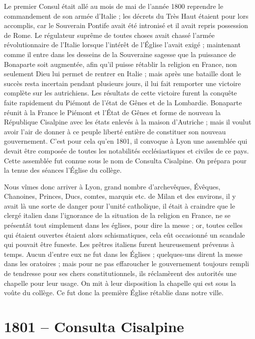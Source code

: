 \documentclass[11pt,a4paper]{report}
\begin{document}
Le premier Consul était allé au mois de mai de l'année 1800 reprendre le commandement de son armée d'Italie ; les décrets du Très Haut étaient pour lors accomplis, car le Souverain Pontife avait été intronisé et il avait repris possession de Rome. Le régulateur suprême de toutes choses avait chassé l'armée révolutionnaire de l'Italie lorsque l'intérêt de l'Église l'avait exigé ; maintenant comme il entre dans les desseins de la Souveraine sagesse que la puissance de Bonaparte soit augmentée, afin qu'il puisse rétablir la religion en France, non seulement Dieu lui permet de rentrer en Italie ; mais après une bataille dont le succès resta incertain pendant plusieurs jours, il lui fait remporter une victoire complète sur les autrichiens. Les résultats de cette victoire furent la conquête faite rapidement du Piémont de l'état de Gênes et de la Lombardie. Bonaparte réunit à la France le Piémont et l'État de Gênes et forme de nouveau la République Cisalpine avec les états enlevés à la maison d'Autriche ; mais il voulut avoir l'air de donner à ce peuple liberté entière de constituer son nouveau gouvernement. C'est pour cela qu'en 1801, il convoque à Lyon une assemblée qui devait être composée de toutes les notabilités ecclésiastiques et civiles de ce pays. Cette assemblée fut connue sous le nom de Consulta Cisalpine. On prépara pour la tenue des séances l'Église du collège.

Nous vîmes donc arriver à Lyon, grand nombre d'archevêques, Évêques, Chanoines, Princes, Ducs, comtes, marquis etc. de Milan et des environs, il y avait là une sorte de danger pour l'unité catholique, il était à craindre que le clergé italien dans l'ignorance de la situation de la religion en France, ne se présentât tout simplement dans les églises, pour dire la messe ; or, toutes celles qui étaient ouvertes étaient alors schismatiques, cela eût occasionné un scandale qui pouvait être funeste. Les prêtres italiens furent heureusement prévenus à temps. Aucun d'entre eux ne fut dans les Églises ; quelques-uns dirent la messe dans les oratoires ; mais pour ne pas effaroucher le gouvernement toujours rempli de tendresse pour ses chers constitutionnels, ils réclamèrent des autorités une chapelle pour leur usage. On mit à leur disposition la chapelle qui est sous la voûte du collège. Ce fut donc la première Église rétablie dans notre ville.

\section*{1801 -- Consulta Cisalpine}
\end{document}
